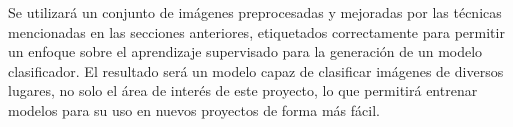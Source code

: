 Se utilizará un conjunto de imágenes preprocesadas y mejoradas por las técnicas mencionadas en las secciones
anteriores, etiquetados correctamente para permitir un enfoque sobre el aprendizaje supervisado para la generación de
un modelo clasificador. El resultado será un modelo capaz de clasificar imágenes de diversos lugares, no solo el área
de interés de este proyecto, lo que permitirá entrenar modelos para su uso en nuevos proyectos de forma más fácil.
